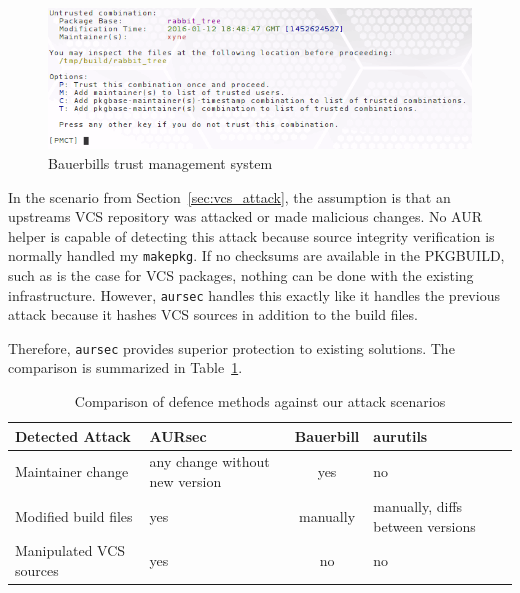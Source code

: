 \begin{figure}
	\includegraphics[width=\linewidth]{img/bb-query_trust-screenshot.png}
	\caption{Bauerbills trust management system \cite{bauerbill}}
	\label{fig:bb-query_trust}
\end{figure}

In the scenario from Section~\ref{sec:vcs_attack}, the assumption is that an upstreams VCS repository was attacked or made malicious changes.
No AUR helper is capable of detecting this attack because source integrity verification is normally handled my \texttt{makepkg}. If no checksums are available in the PKGBUILD, such as is the case for VCS packages, nothing can be done with the existing infrastructure.
However, \texttt{aursec} handles this exactly like it handles the previous attack because it hashes VCS sources in addition to the build files.

Therefore, \texttt{aursec} provides superior protection to existing solutions. The comparison is summarized in Table~\ref{tab:defence-comparison}.

\begin{table}
	\centering
	\begin{tabular}{l|m{3cm}|c|m{3cm}}
	\hline

	\hline
	\textbf{Detected Attack} & \textbf{AURsec} & \textbf{Bauerbill} & \textbf{aurutils} \\
	\hline
		Maintainer change & any change without new version & yes & no \\
		Modified build files & yes & manually & manually, diffs between versions \\
		Manipulated VCS sources & yes & no & no \\
	\hline

	\hline
	\end{tabular}
	\caption{Comparison of defence methods against our attack scenarios}
	\label{tab:defence-comparison}
\end{table}


